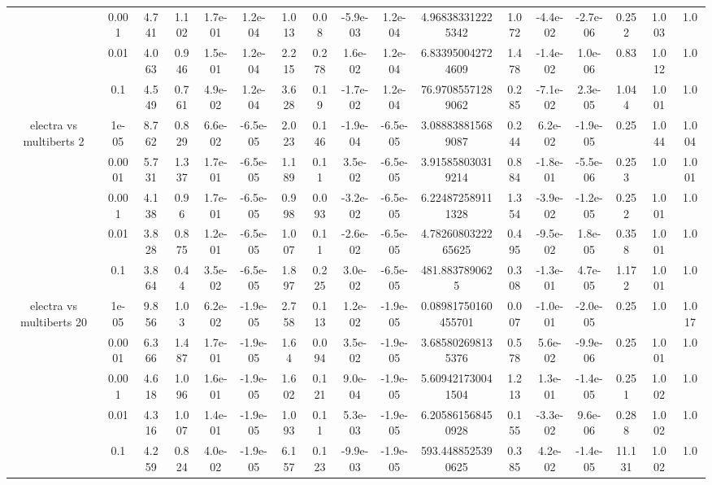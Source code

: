 \begin{tabular}{|c|c|c|c|c|c|c|c|c|c|c|c|c|c|c|c|c|}
 & 0.001 & 4.741 & 1.102 & 1.7e-01 & 1.2e-04 & 1.013 & 0.08 & -5.9e-03 & 1.2e-04 & 4.968383312225342 & 1.072 & -4.4e-02 & -2.7e-06 & 0.252 & 1.003 & 1.0 \\
 & 0.01 & 4.063 & 0.946 & 1.5e-01 & 1.2e-04 & 2.215 & 0.278 & 1.6e-02 & 1.2e-04 & 6.833950042724609 & 1.478 & -1.4e-02 & 1.0e-06 & 0.83 & 1.012 & 1.0 \\
 & 0.1 & 4.549 & 0.761 & 4.9e-02 & 1.2e-04 & 3.628 & 0.19 & -1.7e-02 & 1.2e-04 & 76.97085571289062 & 0.285 & -7.1e-02 & 2.3e-05 & 1.044 & 1.001 & 1.0 \\
\hline
\multirow{5}{*}{electra  vs multiberts 2} & 1e-05 & 8.762 & 0.829 & 6.6e-02 & -6.5e-05 & 2.023 & 0.146 & -1.9e-04 & -6.5e-05 & 3.088838815689087 & 0.244 & 6.2e-02 & -1.9e-05 & 0.25 & 1.044 & 1.004 \\
 & 0.0001 & 5.731 & 1.337 & 1.7e-01 & -6.5e-05 & 1.189 & 0.11 & 3.5e-02 & -6.5e-05 & 3.915858030319214 & 0.884 & -1.8e-01 & -5.5e-06 & 0.253 & 1.0 & 1.001 \\
 & 0.001 & 4.138 & 0.96 & 1.7e-01 & -6.5e-05 & 0.998 & 0.093 & -3.2e-02 & -6.5e-05 & 6.224872589111328 & 1.354 & -3.9e-02 & -1.2e-05 & 0.252 & 1.001 & 1.0 \\
 & 0.01 & 3.828 & 0.875 & 1.2e-01 & -6.5e-05 & 1.007 & 0.11 & -2.6e-02 & -6.5e-05 & 4.7826080322265625 & 0.495 & -9.5e-02 & 1.8e-05 & 0.358 & 1.001 & 1.0 \\
 & 0.1 & 3.864 & 0.44 & 3.5e-02 & -6.5e-05 & 1.897 & 0.225 & 3.0e-02 & -6.5e-05 & 481.8837890625 & 0.308 & -1.3e-01 & 4.7e-05 & 1.172 & 1.001 & 1.0 \\
\hline
\multirow{5}{*}{electra  vs multiberts 20} & 1e-05 & 9.856 & 1.03 & 6.2e-02 & -1.9e-05 & 2.758 & 0.113 & 1.2e-02 & -1.9e-05 & 0.08981750160455701 & 0.007 & -1.0e-01 & -2.0e-05 & 0.25 & 1.0 & 1.017 \\
 & 0.0001 & 6.366 & 1.487 & 1.7e-01 & -1.9e-05 & 1.64 & 0.094 & 3.5e-02 & -1.9e-05 & 3.685802698135376 & 0.578 & 5.6e-02 & -9.9e-06 & 0.25 & 1.001 & 1.0 \\
 & 0.001 & 4.618 & 1.096 & 1.6e-01 & -1.9e-05 & 1.602 & 0.121 & 9.0e-04 & -1.9e-05 & 5.609421730041504 & 1.213 & 1.3e-01 & -1.4e-05 & 0.251 & 1.002 & 1.0 \\
 & 0.01 & 4.316 & 1.007 & 1.4e-01 & -1.9e-05 & 1.093 & 0.11 & 5.3e-03 & -1.9e-05 & 6.205861568450928 & 0.155 & -3.3e-02 & 9.6e-06 & 0.288 & 1.002 & 1.0 \\
 & 0.1 & 4.259 & 0.824 & 4.0e-02 & -1.9e-05 & 6.157 & 0.123 & -9.9e-03 & -1.9e-05 & 593.4488525390625 & 0.385 & 4.2e-02 & -1.4e-05 & 11.131 & 1.002 & 1.0 \\

\end{tabular}
